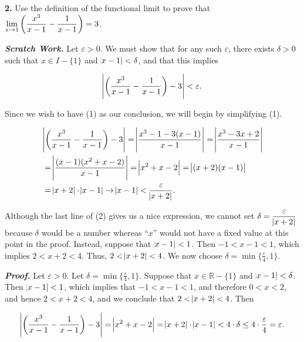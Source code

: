 \documentclass[12pt, a4paper]{article}
\begin{document}
\noindent\textbf{2. } Use the definition of the functional limit to prove that $\lim\limits_{x\rightarrow 1}\bigg(\mathlarger{\frac{x^3}{x-1}}-\mathlarger{\frac{1}{x-1}}\bigg)=3$.

\begin{description} \justifying

    \item\textit{\textbf{Scratch Work.} } Let $\varepsilon>0$. We must show that for any such $\varepsilon$, there exists $\delta>0$ such that $x\in I-\{1\}$ and $\abs{x-1}<\delta$, and that this implies
    
    \begin{equation}
        \abs{\bigg(\frac{x^3}{x-1}-\frac{1}{x-1}\bigg)-3}<\varepsilon.
    \end{equation} 
    
    \item Since we wish to have (1) as our conclusion, we will begin by simplifying (1).
    
    \begin{equation}
        \begin{split}
            &\abs{\bigg(\frac{x^3}{x-1}-\frac{1}{x-1}\bigg)-3} 
             =\abs{\frac{x^3-1-3(x-1)}{x-1}} = \abs{\frac{x^3-3x+2}{x-1}} \\
            &=\abs{\frac{(x-1)(x^2+x-2)}{x-1}} = \abs{x^2+x-2} = \abs{(x+2)(x-1)} \\
            &=\abs{x+2}\cdot\abs{x-1}\rightarrow\abs{x-1}<\frac{\varepsilon}{\abs{x+2}}. 
        \end{split}
    \end{equation}
    
    \par Although the last line of (2) gives us a nice expression, we cannot set $\delta=\mathlarger{\frac{\varepsilon}{\abs{x+2}}}$ because $\delta$ would be a number whereas ``$x$'' would not have a fixed value at this point in the proof. Instead, suppose that $\abs{x-1}<1$. Then $-1<x-1<1$, which implies $2<x+2<4$. Thus, $2<\abs{x+2}<4$. We now choose $\delta=\min\{\frac{\varepsilon}{4},1\}$.
    
    \item\textit{\textbf{Proof.}} Let $\varepsilon>0$. Let $\delta=\min\{\frac{\varepsilon}{4},1\}$. Suppose that $x\in\mathbb{R}-\{1\}$ and $\abs{x-1}<\delta$. Then $\abs{x-1}<1$, which implies that $-1<x-1<1$, and therefore $0<x<2$, and hence $2<x+2<4$, and we conclude that $2<\abs{x+2}<4$. Then
    
    \begin{equation*}
        \abs{\bigg(\frac{x^3}{x-1}-\frac{1}{x-1}\bigg)-3} = \abs{x^2+x-2} = \abs{x+2}\cdot\abs{x-1}<4\cdot\delta\leq 4\cdot\frac{\varepsilon}{4}=\varepsilon.
    \end{equation*}
    
    \hspace{144mm}\square
    
\end{description}
\end{document}
